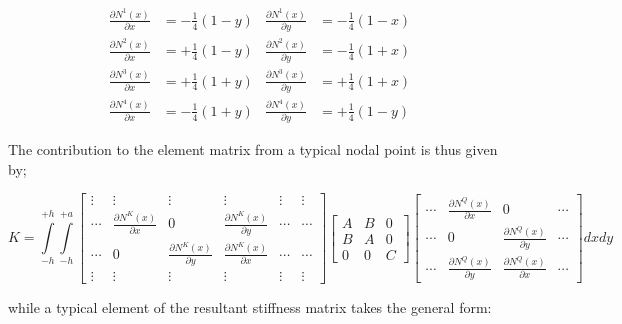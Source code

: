 \begin{align*}
\frac{{\partial {N^1}(x)}}{{\partial x}} & =  - \frac{1}{4}(1 - y)           &  \frac{{\partial {N^1}(x)}}{{\partial y}} & =  - \frac{1}{4}(1 - x)\\
\frac{{\partial {N^2}(x)}}{{\partial x}} & =  + \frac{1}{4}(1 - y)           &  \frac{{\partial {N^2}(x)}}{{\partial y}} & =  - \frac{1}{4}(1 + x)\\
\frac{{\partial {N^3}(x)}}{{\partial x}} & =  + \frac{1}{4}(1 + y)           &  \frac{{\partial {N^3}(x)}}{{\partial y}} & =  + \frac{1}{4}(1 + x)\\
\frac{{\partial {N^4}(x)}}{{\partial x}} & =  - \frac{1}{4}(1 + y)           &  \frac{{\partial {N^4}(x)}}{{\partial y}} & =  + \frac{1}{4}(1 - y)
\end{align*}


The contribution to the element matrix from a typical nodal point is thus given by;



\[K = \int\limits_{ - h}^{ + h} {\int\limits_{ - h}^{ + a} {\begin{bmatrix}

 \vdots &  \vdots & \vdots &  \vdots & \vdots & \vdots \\
 \cdots &  \frac{{\partial {N^K}(x)}}{{\partial x}} & 0   & \frac{{\partial {N^K}(x)}}{{\partial y}} &  \cdots & \cdots \\
  \cdots &  0 & \frac{{\partial {N^K}(x)}}{{\partial y}}   & \frac{{\partial {N^K}(x)}}{{\partial x}} &  \cdots & \cdots \\
 \vdots &  \vdots & \vdots &  \vdots & \vdots & \vdots 

\end{bmatrix}
%
\begin{bmatrix}
 A & B &  0\\
 B & A & 0 \\
 0 &  0 & C
\end{bmatrix}
%
\begin{bmatrix}
 \cdots & \frac{{\partial {N^Q}(x)}}{{\partial x}} & 0  & \cdots \\
 \cdots & 0 & \frac{{\partial {N^Q}(x)}}{{\partial y}}  & \cdots \\
 \cdots & \frac{{\partial {N^Q}(x)}}{{\partial y}} & \frac{{\partial {N^Q}(x)}}{{\partial x}}  & \cdots 
\end{bmatrix} dxdy} } \]


while a typical element of the resultant stiffness matrix takes the general form:


